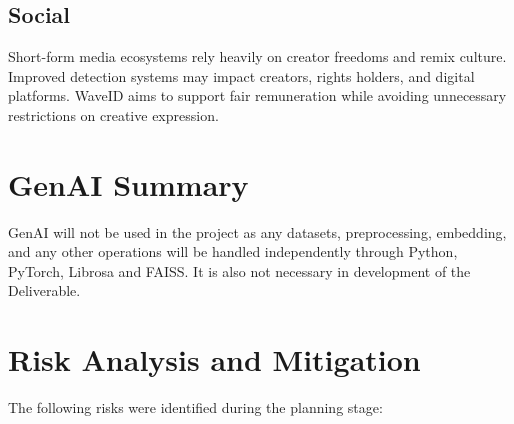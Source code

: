 \subsection*{Social}
Short-form media ecosystems rely heavily on creator freedoms and remix culture.  
Improved detection systems may impact creators, rights holders, and digital 
platforms. WaveID aims to support fair remuneration while avoiding unnecessary 
restrictions on creative expression.

\section{GenAI Summary}
GenAI will not be used in the project as any datasets, preprocessing, embedding, and any other operations will be handled independently through Python, PyTorch, Librosa and FAISS. It is also not necessary in development of the Deliverable.

\section{Risk Analysis and Mitigation}
The following risks were identified during the planning stage:
